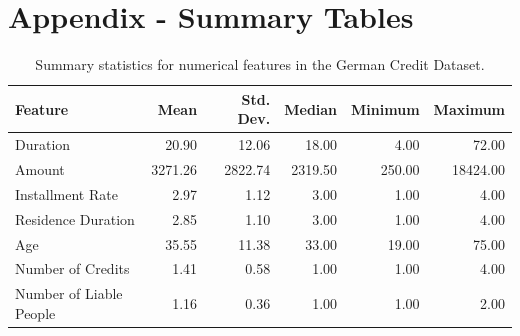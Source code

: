 \documentclass[12pt]{article}
\begin{document}
\newpage
\appendix
\section{Appendix - Summary Tables}

\begin{table}[ht]
\centering
\begin{tabular}{lrrrrr}
  \hline
 Feature & Mean & Std. Dev. & Median & Minimum & Maximum \\ 
  \hline
Duration & 20.90 & 12.06 & 18.00 & 4.00 & 72.00 \\ 
  Amount & 3271.26 & 2822.74 & 2319.50 & 250.00 & 18424.00 \\ 
  Installment Rate & 2.97 & 1.12 & 3.00 & 1.00 & 4.00 \\ 
  Residence Duration & 2.85 & 1.10 & 3.00 & 1.00 & 4.00 \\ 
  Age & 35.55 & 11.38 & 33.00 & 19.00 & 75.00 \\ 
  Number of Credits & 1.41 & 0.58 & 1.00 & 1.00 & 4.00 \\ 
  Number of Liable People & 1.16 & 0.36 & 1.00 & 1.00 & 2.00 \\ 
   \hline
\end{tabular}
\caption[Summary statistics for numerical features]{Summary statistics for numerical features in the German Credit Dataset.}\label{summary_numeric}
\end{table}
\end{document}
